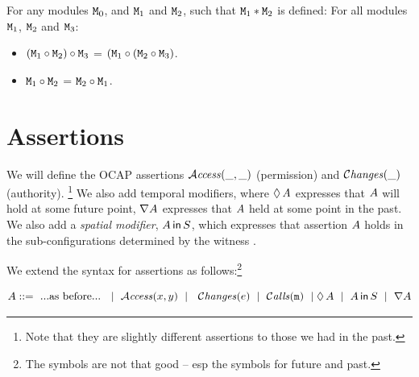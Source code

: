 \documentclass[acmsmall,screen]{acmart}
\begin{document}
 \begin{lemma}
 For any modules ${\mbox{\tt{M}}}_0$, and ${\mbox{\tt{M}}}_1$ and ${\mbox{\tt{M}}}_2$, such that ${\mbox{\tt{M}}}_1*{\mbox{\tt{M}}}_2$ is defined:  
 \label{lemma:linking:properties}
 For all modules ${\mbox{\tt{M}}}_1$, ${\mbox{\tt{M}}}_2$ and ${\mbox{\tt{M}}}_3$:
 
 \begin{itemize}
     \item 
     $({\mbox{\tt{M}}}_1\circ {\mbox{\tt{M}}}_2)\circ {\mbox{\tt{M}}}_3$ = $({\mbox{\tt{M}}}_1\circ ({\mbox{\tt{M}}}_2 \circ {\mbox{\tt{M}}}_3)$.
    \item  
      ${\mbox{\tt{M}}}_1\circ {\mbox{\tt{M}}}_2$  = ${\mbox{\tt{M}}}_2\circ{\mbox{\tt{M}}}_1$.
   \end{itemize}
 
 \end{lemma}

\section{ Assertions}
 
 
 



We will define the OCAP assertions ${\mathcal{A}}\textrm{\textit{ccess}}(\_,\_)$  (permission)
and   $\mathcal{C}\textrm{\textit{hanges}}(\_)$ (authority). \footnote{Note that they are slightly different
assertions to those we had in the past.}
We also add temporal modifiers, where $\lozenge\, A$ expresses that $A$ will hold at some future point,
$\nabla A$ expresses that $A$ held at some point in the past.
We also add a {\em spatial modifier}, $A\,{\bf{\sf {in}}}\, S$, which expresses that assertion $A$ holds in
the sub-configurations determined by the witness .

We extend the syntax for assertions as follows:\footnote{The symbols are not that good -- esp the symbols for future and past.}

\begin{definition}[Assertions]
$$\A ::=\  ... \mbox{as before} ...\ \ \mid \ \CanAccess x y \ \mid\  \ \Changes e \ \mid\  \Calls{m} \ \mid\  \\ \Future \A \ \mid \ \Using \A S  \ \mid \  \Past \A$$
\end{definition}
\end{document}

